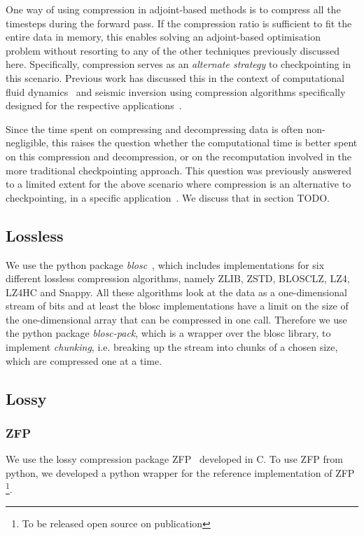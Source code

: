 One way of using compression in adjoint-based methods is to compress
all the timesteps during the forward pass. If the compression ratio is
sufficient to fit the entire data in memory, this enables solving an
adjoint-based optimisation problem without resorting to any of the
other techniques previously discussed here. Specifically, compression
serves as an \emph{alternate strategy} to checkpointing in this
scenario. Previous work has discussed this in the context of
computational fluid dynamics~\cite{cyr2015towards,marin2016large} and seismic
inversion using compression algorithms specifically designed for
the respective applications~\cite{dalmau2014lossy,boehm2016wavefield}. 

Since the time spent on compressing and decompressing data is often
non-negligible, this raises the question whether the computational
time is better spent on this compression and decompression, or on the
recomputation involved in the more traditional checkpointing
approach. This question was previously answered to a limited extent
for the above scenario where compression is an alternative to
checkpointing, in a specific application~\cite{cyr2015towards}. We discuss
that in section TODO. 

\subsection{Lossless}
We use the python package \emph{blosc}~\cite{blosc}, which includes implementations for
six different lossless compression algorithms, namely ZLIB, ZSTD, BLOSCLZ,
LZ4, LZ4HC and Snappy. All these algorithms look at the data as a one-dimensional stream of bits
and at least the blosc implementations have a limit on the size of the one-dimensional array that
can be compressed in one call. Therefore we use the python package \emph{blosc-pack}, which is
a wrapper over the blosc library, to implement \emph{chunking}, i.e. breaking up the stream into
chunks of a chosen size, which are compressed one at a time. 

\subsection{Lossy}
\subsubsection{ZFP}
We use the lossy compression package ZFP~\cite{lindstrom2014fixed} developed in
C. To use ZFP from python, we developed a python wrapper for the reference
implementation of ZFP \footnote{To be released open source on publication}.

